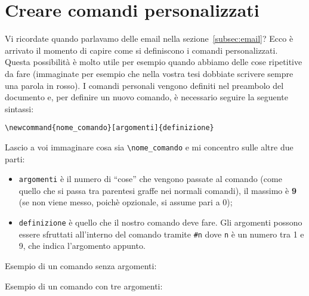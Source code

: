 \chapter{Creare comandi personalizzati}
Vi ricordate quando parlavamo delle email nella sezione~\ref{subsec:email}? 
Ecco è arrivato il momento di capire come si definiscono i comandi 
personalizzati. Questa possibilità è molto utile per esempio quando abbiamo 
delle cose ripetitive da fare (immaginate per esempio che nella vostra tesi 
dobbiate scrivere sempre una parola in rosso). I comandi personali vengono 
definiti nel preambolo del documento e, per definire un nuovo comando, è 
necessario seguire la seguente sintassi: \\
\begin{center}
    \verb!\newcommand{nome_comando}[argomenti]{definizione}!
\end{center}
Lascio a voi immaginare cosa sia \verb!\nome_comando! e mi concentro sulle 
altre due parti:
\begin{itemize}
    \item \verb!argomenti! è il numero di ``cose'' che vengono passate al 
    comando (come quello che si passa tra parentesi graffe nei normali 
    comandi), il massimo è \textbf{9} (se non viene messo, poichè opzionale, 
    si assume pari a 0);
    \item \verb!definizione! è quello che il nostro comando deve fare. Gli 
    argomenti possono essere sfruttati all'interno del comando tramite 
    \verb!#n! dove \verb!n! è un numero tra 1 e 9, che indica l'argomento 
    appunto.
\end{itemize}

Esempio di un comando senza argomenti:


Esempio di un comando con tre argomenti:
